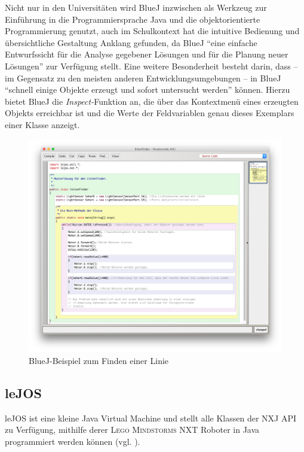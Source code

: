 \documentclass[paper=a4, DIV=calc, BCOR=12mm, twoside=on, onecolumn=on, open = right, titlepage =on, parskip =half-, headsepline = on, footsepline = off, chapterprefix = off, appendixprefix = on, fontsize = 12pt, numbers = noenddot, abstract = on]{scrbook}
\begin{document}
Nicht nur in den Universitäten wird BlueJ inzwischen als Werkzeug zur Einführung in die Programmiersprache Java und die objektorientierte Programmierung genutzt, auch im Schulkontext hat die intuitive Bedienung und übersichtliche Gestaltung Anklang gefunden, da BlueJ "`eine einfache Entwurfssicht für die Analyse gegebener Lösungen und für die Planung neuer Lösungen"' \cite[S.6]{ehmann:09} zur Verfügung stellt. Eine weitere Besonderheit besteht darin, dass -- im Gegensatz zu den meisten anderen Entwicklungsumgebungen -- in BlueJ "`schnell einige Objekte erzeugt und sofort untersucht werden"' \cite[S.6]{ehmann:09} können. Hierzu bietet BlueJ die \emph{Inspect-}Funktion an, die über das Kontextmenü eines erzeugten Objekts erreichbar ist und die Werte der Feldvariablen genau dieses Exemplars einer Klasse anzeigt.
\vspace*{-2ex}
\begin{figure}[htpb]
\centering
\includegraphics[width=\textwidth]{images/linienfinder_bluej.png} 
\caption{BlueJ-Beispiel zum Finden einer Linie}
\label{fig:Bsp BlueJ Linienfinder}
\end{figure}


\par \singlespacing
\subsection{leJOS}
\label{sec:lejos}
\onehalfspacing
leJOS ist eine kleine Java Virtual Machine und stellt alle Klassen der NXJ API zu Verfügung, mithilfe derer \textsc{Lego Mindstorms} NXT Roboter in Java programmiert werden können (vgl. \cite{lejos}).
\end{document}
